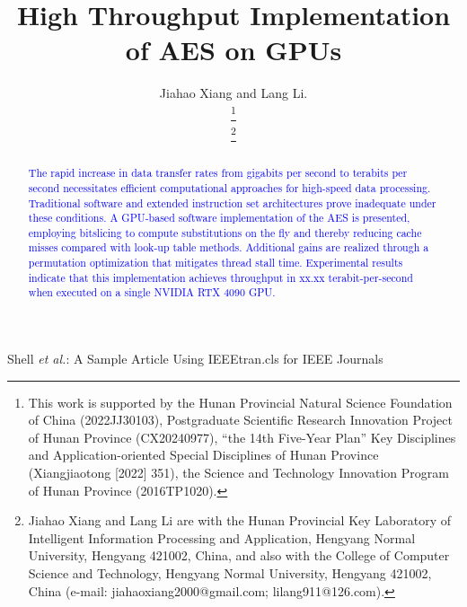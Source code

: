 \documentclass[journal]{IEEEtran}
\begin{document}
\title{High Throughput Implementation of AES on GPUs} 


\author{Jiahao Xiang and Lang Li.

\thanks{This work is supported by the Hunan Provincial Natural Science Foundation of China (2022JJ30103), Postgraduate Scientific Research Innovation Project of Hunan Province (CX20240977), “the 14th Five-Year Plan” Key Disciplines and Application-oriented Special Disciplines of Hunan Province (Xiangjiaotong [2022] 351), the Science and Technology Innovation Program of Hunan Province (2016TP1020).}


\thanks{Jiahao Xiang and Lang Li are with the Hunan Provincial Key Laboratory of Intelligent Information Processing and Application, Hengyang Normal University, Hengyang 421002, China, and also with the College of Computer Science and Technology, Hengyang Normal University, Hengyang 421002, China (e-mail: jiahaoxiang2000@gmail.com; lilang911@126.com).}%
}

%
{Shell \MakeLowercase{\textit{et al.}}: A Sample Article Using IEEEtran.cls for IEEE Journals}

\IEEEpubid{}

\maketitle


\begin{abstract}
   \textcolor{blue}{The rapid increase in data transfer rates from gigabits per second to terabits per second necessitates efficient computational approaches for high-speed data processing. Traditional software and extended instruction set architectures prove inadequate under these conditions. A GPU-based software implementation of the AES is presented, employing bitslicing to compute substitutions on the fly and thereby reducing cache misses compared with look-up table methods. Additional gains are realized through a permutation optimization that mitigates thread stall time. Experimental results indicate that this implementation achieves throughput in xx.xx terabit-per-second when executed on a single NVIDIA RTX 4090 GPU.
   } 
    
\end{abstract}
\end{document}
